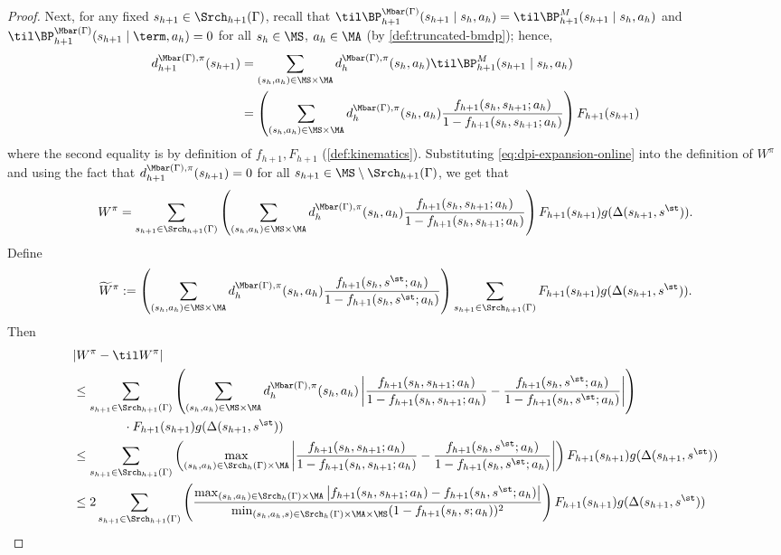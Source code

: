 \begin{proof}
Next, for any fixed $s_{h+1} \in \Srch_{h+1}(\Gamma)$, recall that $\til\BP^{\Mbar(\Gamma)}_{h+1}(s_{h+1}\mid{}s_h,a_h) = \til\BP^M_{h+1}(s_{h+1}\mid{}s_h,a_h)$ and $\til\BP^{\Mbar(\Gamma)}_{h+1}(s_{h+1}\mid{}\term,a_h) = 0$ for all $s_h\in\MS$, $a_h \in \MA$ (by \cref{def:truncated-bmdp}); hence,
\begin{align}
d^{\Mbar(\Gamma),\pi}_{h+1}(s_{h+1}) 
&= \sum_{(s_h,a_h) \in \MS\times\MA} d^{\Mbar(\Gamma),\pi}_h(s_h,a_h)  \til\BP^M_{h+1}(s_{h+1}\mid{}s_h,a_h) \nonumber\\ 
&= \left(\sum_{(s_h,a_h)\in\MS\times\MA} d^{\Mbar(\Gamma),\pi}_h(s_h,a_h) \frac{f_{h+1}(s_h,s_{h+1};a_h)}{1-f_{h+1}(s_h,s_{h+1};a_h)}\right) F_{h+1}(s_{h+1})\label{eq:dpi-expansion-online}
\end{align} 
where the second equality is by definition of $f_{h+1},F_{h+1}$ (\cref{def:kinematics}). Substituting \cref{eq:dpi-expansion-online} into the definition of $W^\pi$ and using the fact that $d^{\Mbar(\Gamma),\pi}_{h+1}(s_{h+1}) = 0$ for all $s_{h+1} \in \MS\setminus \Srch_{h+1}(\Gamma)$, we get that 
\[W^\pi = \sum_{s_{h+1}\in\Srch_{h+1}(\Gamma)} \left(\sum_{(s_h,a_h)\in\MS\times\MA} d^{\Mbar(\Gamma),\pi}_h(s_h,a_h) \frac{f_{h+1}(s_h,s_{h+1};a_h)}{1-f_{h+1}(s_h,s_{h+1};a_h)}\right) F_{h+1}(s_{h+1}) g(\Delta(s_{h+1},s^\st)).\]
Define 
\[\widetilde W^\pi :=  \left(\sum_{(s_h,a_h)\in\MS\times\MA} d^{\Mbar(\Gamma),\pi}_h(s_h,a_h) \frac{f_{h+1}(s_h,s^\st;a_h)}{1-f_{h+1}(s_h,s^\st;a_h)}\right) \sum_{s_{h+1}\in\Srch_{h+1}(\Gamma)} F_{h+1}(s_{h+1}) g(\Delta(s_{h+1},s^\st)).\]
Then
\begin{align}
&|W^\pi - \til W^\pi| \nonumber\\ 
&\leq \sum_{s_{h+1}\in\Srch_{h+1}(\Gamma)} \left(\sum_{(s_h,a_h)\in\MS\times\MA} d^{\Mbar(\Gamma),\pi}_h(s_h,a_h) \left|\frac{f_{h+1}(s_h,s_{h+1};a_h)}{1-f_{h+1}(s_h,s_{h+1};a_h)} - \frac{f_{h+1}(s_h,s^\st;a_h)}{1-f_{h+1}(s_h,s^\st;a_h)}\right|\right)  \nonumber\\ &\qquad\qquad \cdot F_{h+1}(s_{h+1}) g(\Delta(s_{h+1},s^\st)) \nonumber\\ 
&\leq \sum_{s_{h+1}\in\Srch_{h+1}(\Gamma)} \left(\max_{(s_h,a_h) \in \Srch_h(\Gamma)\times\MA} \left|\frac{f_{h+1}(s_h,s_{h+1};a_h)}{1-f_{h+1}(s_h,s_{h+1};a_h)} - \frac{f_{h+1}(s_h,s^\st;a_h)}{1-f_{h+1}(s_h,s^\st;a_h)}\right|\right) F_{h+1}(s_{h+1}) g(\Delta(s_{h+1},s^\st)) \nonumber\\ 
&\leq 2\sum_{s_{h+1}\in\Srch_{h+1}(\Gamma)} \left(\frac{\max_{(s_h,a_h) \in \Srch_h(\Gamma)\times\MA} \left|f_{h+1}(s_h,s_{h+1};a_h) - f_{h+1}(s_h,s^\st;a_h)\right|}{\min_{(s_h,a_h,s) \in \Srch_h(\Gamma)\times\MA\times\MS} (1-f_{h+1}(s_h,s;a_h))^2}\right) F_{h+1}(s_{h+1}) g(\Delta(s_{h+1},s^\st)) \nonumber\\

\end{align}
\end{proof}
